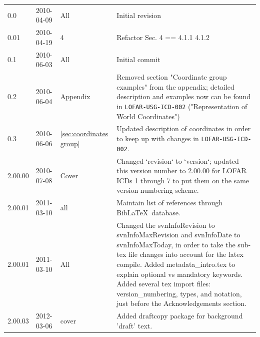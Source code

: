 \documentclass[a4paper,10pt,bibtotoc]{scrartcl}
\begin{document}
\begin{center}
  \tablelasttail{\hline}
  \begin{supertabular}{lllp{10cm}}
    0.0  & 2010-04-09 & All & Initial revision \\
    0.01 & 2010-04-19 & 4   & Refactor Sec. 4 == 4.1.1 4.1.2 \\
    0.1  & 2010-06-03 & All & Initial commit \\
    0.2  & 2010-06-04 & Appendix & Removed section "Coordinate group examples"
    from the appendix; detailed description and examples now can be found in
    \texttt{LOFAR-USG-ICD-002} ("Representation of World Coordinates") \\
    0.3  & 2010-06-06 & \ref{sec:coordinates group} & Updated description of
    coordinates in order to keep up with changes in \texttt{LOFAR-USG-ICD-002}. \\
    2.00.00  & 2010-07-08 & Cover & Changed `revision` to `version`;  updated 
    this version number to 2.00.00 for LOFAR ICDs 1 through 7 to put them on the same
    version numbering scheme.\\
    2.00.01  & 2011-03-10 & all & Maintain list of references through
    Bib\LaTeX\ database. \\
    2.00.01  & 2011-03-10 & All  & Changed the svnInfoRevision to 
    svnInfoMaxRevision and svnInfoDate to svnInfoMaxToday, in order to take the sub-tex 
    file changes into account for the latex compile.  Added metadata\_intro.tex to explain
    optional vs mandatory keywords. Added several tex import files: version\_numbering, types,
    and notation, just before the Acknowledgements section.  \\
    2.00.03 & 2012-03-06 & cover   & Added draftcopy package for background 'draft' text.\\

  \end{supertabular}
\end{center}
\end{document}
